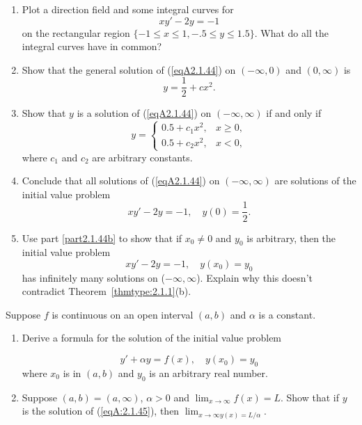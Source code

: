 \documentclass{ximera}
\begin{document}
\begin{problem}\label{exer:2.1.44}
\begin{enumerate}
\item %
Plot a direction field and some integral curves for
\begin{equation}\label{eqA2.1.44}
    xy'-2y=-1
\end{equation}
on the rectangular region  $\{-1\leq x\leq 1, -.5\leq y\leq 1.5\}$.
What do all the integral curves have in common?
\item \label{part2.1.44b}%
Show that the general solution of (\ref{eqA2.1.44})
on $(-\infty,0)$ and $(0,\infty)$ is
$$
y=\frac{1}{2}+cx^2.
$$
\item %
Show that $y$ is a solution of (\ref{eqA2.1.44}) on
$(-\infty,\infty)$ if and only if
$$
y=\left\{\begin{array}{ll}0.5+c_1x^2, &x
\ge 0,\\
0.5+c_2x^2, &x < 0,\end{array}\right.
$$
 where $c_1$ and $c_2$ are arbitrary constants.
\item %
Conclude that all solutions of (\ref{eqA2.1.44}) on
$(-\infty,\infty)$ are solutions of the initial value problem
$$
xy'-2y=-1,\quad y(0)=\frac{1}{2}.
$$
\item %
Use part \ref{part2.1.44b} to show that if  $x_0\neq 0$ and $y_0$  is arbitrary, then
  the  initial value problem
$$
xy'-2y=-1,\quad y(x_0)=y_0
$$
has infinitely many solutions on ($-\infty,\infty$). Explain why this
doesn't contradict  Theorem~\ref{thmtype:2.1.1}(b).
\end{enumerate}
\end{problem}

\begin{problem}\label{exer:2.1.45}
Suppose $f$ is continuous on an open interval $(a,b)$
and $\alpha$ is a constant.
\begin{enumerate}
\item %
Derive a formula for the solution of the initial value
problem

\begin{equation}\label{eqA:2.1.45}
y'+\alpha y=f(x),\quad y(x_0)=y_0
\end{equation}
where $x_0$ is in $(a,b)$ and $y_0$ is an arbitrary real number.

\item %
Suppose $(a,b)=(a,\infty)$, $\alpha > 0$ and
$\lim_{x\to\infty} f(x)=L$. Show that if $y$ is the
solution of (\ref{eqA:2.1.45}), then $\lim_{x\to
\infty y(x)=L/\alpha}$.
\end{enumerate}
\end{problem}
\end{document}
